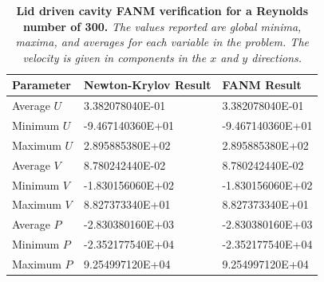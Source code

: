 \begin{table}[h!]
  \begin{center}
    \begin{tabular}{lll}\hline\hline
      \multicolumn{1}{l}{Parameter}& 
      \multicolumn{1}{l}{Newton-Krylov Result}&
      \multicolumn{1}{l}{FANM Result}\\
      \hline
      Average $U$ & 3.382078040E-01 & 3.382078040E-01 \\
      Minimum $U$ & -9.467140360E+01 & -9.467140360E+01 \\
      Maximum $U$ & 2.895885380E+02 & 2.895885380E+02 \\
      \hline
      Average $V$ & 8.780242440E-02 & 8.780242440E-02 \\
      Minimum $V$ & -1.830156060E+02 & -1.830156060E+02 \\
      Maximum $V$ & 8.827373340E+01 & 8.827373340E+01 \\
      \hline
      Average $P$ & -2.830380160E+03 & -2.830380160E+03 \\
      Minimum $P$ & -2.352177540E+04 & -2.352177540E+04 \\
      Maximum $P$ & 9.254997120E+04 & 9.254997120E+04 \\
      \hline\hline
    \end{tabular}
  \end{center}
  \caption{\textbf{Lid driven cavity FANM verification for a Reynolds
      number of 300.} \textit{The values reported are global minima,
      maxima, and averages for each variable in the problem. The
      velocity is given in components in the $x$ and $y$ directions.}}
  \label{tab:driven_re300_results}
\end{table}

